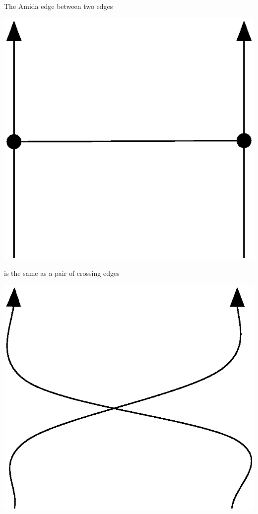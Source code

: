  The Amida edge between two edges
 \begin{center}
\includegraphics[scale=0.4]{twoedges_amida_without_label.eps}
 \end{center}
is the same as a pair of crossing edges
 \begin{center}
\includegraphics[scale=0.4]{crossing.eps}
 \end{center}
